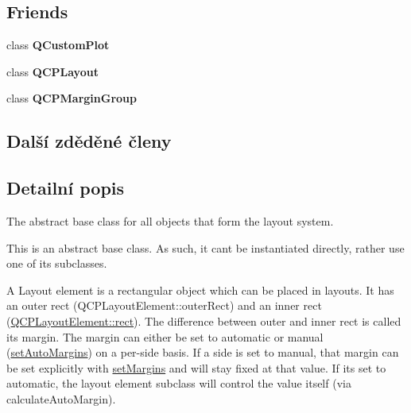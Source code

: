 \subsection*{Friends}
\begin{DoxyCompactItemize}
\item 
\hypertarget{classQCPLayoutElement_a1cdf9df76adcfae45261690aa0ca2198}{}class {\bfseries Q\+Custom\+Plot}\label{classQCPLayoutElement_a1cdf9df76adcfae45261690aa0ca2198}

\item 
\hypertarget{classQCPLayoutElement_a588aac0a0d721f6c5f10126d8596a20f}{}class {\bfseries Q\+C\+P\+Layout}\label{classQCPLayoutElement_a588aac0a0d721f6c5f10126d8596a20f}

\item 
\hypertarget{classQCPLayoutElement_ad077a686e85ab6fa03dcb2fd37fc499a}{}class {\bfseries Q\+C\+P\+Margin\+Group}\label{classQCPLayoutElement_ad077a686e85ab6fa03dcb2fd37fc499a}

\end{DoxyCompactItemize}
\subsection*{Další zděděné členy}


\subsection{Detailní popis}
The abstract base class for all objects that form the layout system. 

This is an abstract base class. As such, it can\textquotesingle{}t be instantiated directly, rather use one of its subclasses.

A Layout element is a rectangular object which can be placed in layouts. It has an outer rect (Q\+C\+P\+Layout\+Element\+::outer\+Rect) and an inner rect (\hyperlink{classQCPLayoutElement_affdfea003469aac3d0fac5f4e06171bc}{Q\+C\+P\+Layout\+Element\+::rect}). The difference between outer and inner rect is called its margin. The margin can either be set to automatic or manual (\hyperlink{classQCPLayoutElement_accfda49994e3e6d51ed14504abf9d27d}{set\+Auto\+Margins}) on a per-\/side basis. If a side is set to manual, that margin can be set explicitly with \hyperlink{classQCPLayoutElement_a8f450b1f3f992ad576fce2c63d8b79cf}{set\+Margins} and will stay fixed at that value. If it\textquotesingle{}s set to automatic, the layout element subclass will control the value itself (via calculate\+Auto\+Margin).

